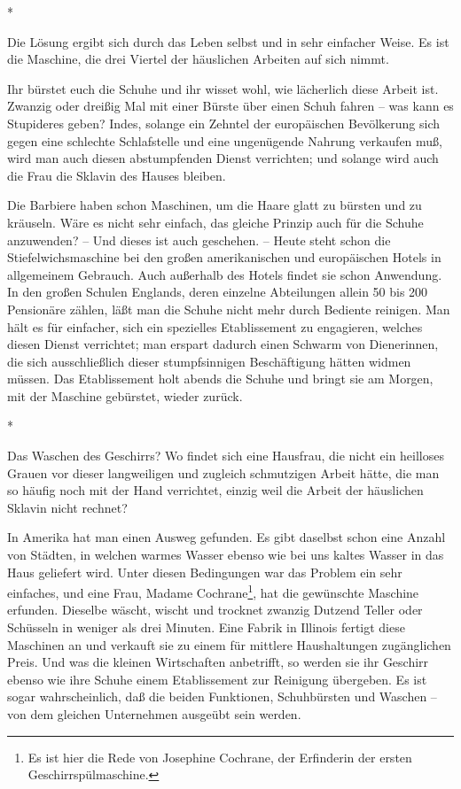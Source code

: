 \documentclass{scrbook}
\begin{document}
\begin{center}*\end{center}

Die Lösung ergibt sich durch das Leben selbst und in sehr einfacher Weise. Es ist die Maschine, die drei Viertel der häuslichen Arbeiten auf sich nimmt.

Ihr bürstet euch die Schuhe und ihr wisset wohl, wie lächerlich diese Arbeit ist. Zwanzig oder dreißig Mal mit einer Bürste über einen Schuh fahren – was kann es Stupideres geben? Indes, solange ein Zehntel der europäischen Bevölkerung sich gegen eine schlechte Schlafstelle und eine ungenügende Nahrung verkaufen muß, wird man auch diesen abstumpfenden Dienst verrichten; und solange wird auch die Frau die Sklavin des Hauses bleiben.

Die Barbiere haben schon Maschinen, um die Haare glatt zu bürsten und zu kräuseln. Wäre es nicht sehr einfach, das gleiche Prinzip auch für die Schuhe anzuwenden? – Und dieses ist auch geschehen. – Heute steht schon die Stiefelwichsmaschine bei den großen amerikanischen und europäischen Hotels in allgemeinem Gebrauch. Auch außerhalb des Hotels findet sie schon Anwendung. In den großen Schulen Englands, deren einzelne Abteilungen allein 50 bis 200 Pensionäre zählen, läßt man die Schuhe nicht mehr durch Bediente reinigen. Man hält es für einfacher, sich ein spezielles Etablissement zu engagieren, welches diesen Dienst verrichtet; man erspart dadurch einen Schwarm von Dienerinnen, die sich ausschließlich dieser stumpfsinnigen Beschäftigung hätten widmen müssen. Das Etablissement holt abends die Schuhe und bringt sie am Morgen, mit der Maschine gebürstet, wieder zurück.

\begin{center}*\end{center}

Das Waschen des Geschirrs? Wo findet sich eine Hausfrau, die nicht ein heilloses Grauen vor dieser langweiligen und zugleich schmutzigen Arbeit hätte, die man so häufig noch mit der Hand verrichtet, einzig weil die Arbeit der häuslichen Sklavin nicht rechnet?

In Amerika hat man einen Ausweg gefunden. Es gibt daselbst schon eine Anzahl von Städten, in welchen warmes Wasser ebenso wie bei uns kaltes Wasser in das Haus geliefert wird. Unter diesen Bedingungen war das Problem ein sehr einfaches, und eine Frau, Madame Cochrane\footnote{Es ist hier die Rede von Josephine Cochrane, der Erfinderin der ersten Geschirrspülmaschine.}, hat die gewünschte Maschine erfunden. Dieselbe wäscht, wischt und trocknet zwanzig Dutzend Teller oder Schüsseln in weniger als drei Minuten. Eine Fabrik in Illinois fertigt diese Maschinen an und verkauft sie zu einem für mittlere Haushaltungen zugänglichen Preis. Und was die kleinen Wirtschaften anbetrifft, so werden sie ihr Geschirr ebenso wie ihre Schuhe einem Etablissement zur Reinigung übergeben. Es ist sogar wahrscheinlich, daß die beiden Funktionen, Schuhbürsten und Waschen – von dem gleichen Unternehmen ausgeübt sein werden.
\end{document}
